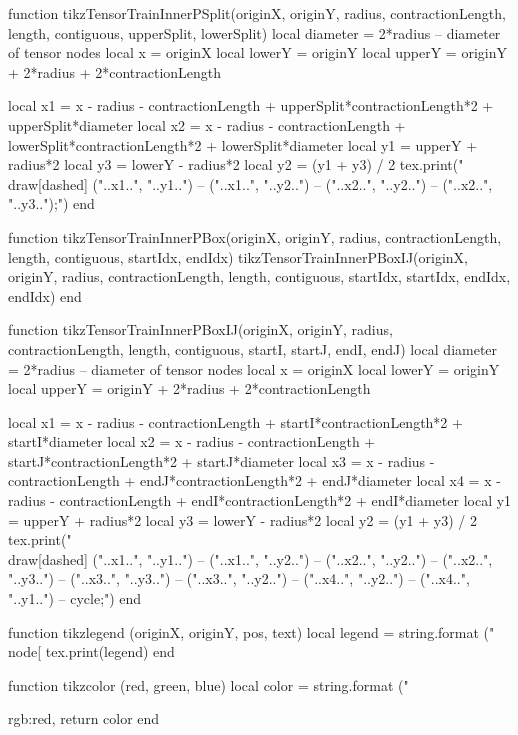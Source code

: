 \begin{luacode*}
function tikzTensorTrainInnerPSplit(originX, originY, radius, contractionLength, length, contiguous, upperSplit, lowerSplit)
	 local diameter = 2*radius         -- diameter of tensor nodes
	 local x = originX
	 local lowerY = originY
	 local upperY = originY + 2*radius + 2*contractionLength

	 local x1 = x - radius - contractionLength + upperSplit*contractionLength*2 + upperSplit*diameter
	 local x2 = x - radius - contractionLength + lowerSplit*contractionLength*2 + lowerSplit*diameter
	 local y1 = upperY + radius*2
	 local y3 = lowerY - radius*2
	 local y2 = (y1 + y3) / 2
	 tex.print("\\draw[dashed] ("..x1..", "..y1..") -- ("..x1..", "..y2..") -- ("..x2..", "..y2..") -- ("..x2..", "..y3..");")
end

function tikzTensorTrainInnerPBox(originX, originY, radius, contractionLength, length, contiguous, startIdx, endIdx)
	 tikzTensorTrainInnerPBoxIJ(originX, originY, radius, contractionLength, length, contiguous, startIdx, startIdx, endIdx, endIdx)
end

function tikzTensorTrainInnerPBoxIJ(originX, originY, radius, contractionLength, length, contiguous, startI, startJ, endI, endJ)
	 local diameter = 2*radius         -- diameter of tensor nodes
	 local x = originX
	 local lowerY = originY
	 local upperY = originY + 2*radius + 2*contractionLength

	 local x1 = x - radius - contractionLength + startI*contractionLength*2 + startI*diameter
	 local x2 = x - radius - contractionLength + startJ*contractionLength*2 + startJ*diameter
	 local x3 = x - radius - contractionLength + endJ*contractionLength*2 + endJ*diameter
	 local x4 = x - radius - contractionLength + endI*contractionLength*2 + endI*diameter
	 local y1 = upperY + radius*2
	 local y3 = lowerY - radius*2
	 local y2 = (y1 + y3) / 2
	 tex.print("\\draw[dashed] ("..x1..", "..y1..") -- ("..x1..", "..y2..") -- ("..x2..", "..y2..") -- ("..x2..", "..y3..") -- ("..x3..", "..y3..") -- ("..x3..", "..y2..") -- ("..x4..", "..y2..") -- ("..x4..", "..y1..") -- cycle;")
end

function tikzlegend (originX, originY, pos, text)
	 local legend = string.format ("\\node[%
	 tex.print(legend)
end

function tikzcolor (red, green, blue)
	 local color = string.format ("{rgb:red,%
	 return color
end

}
\end{luacode*}
